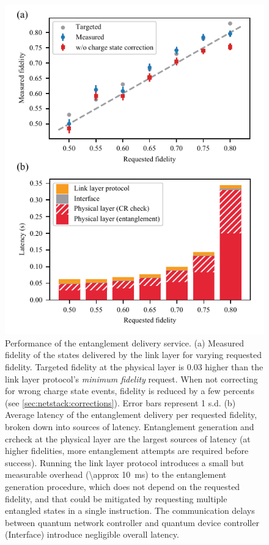 \begin{figure}
    \centering
    \includegraphics[width=0.6\linewidth]{figures/latencyvsfid.pdf}
    \caption{
        Performance of the entanglement delivery service.
        (a) Measured fidelity of the states delivered by the link layer for varying requested
        fidelity. Targeted fidelity at the physical layer is 0.03 higher than the link layer
        protocol's \emph{minimum fidelity} request. When not correcting for wrong charge state
        events, fidelity is reduced by a few percents (see \cref{sec:netstack:corrections}). Error
        bars represent \num{1} s.d.
        (b) Average latency of the entanglement delivery per requested fidelity, broken down into
        sources of latency. Entanglement generation and \acrlong{crcheck} at the physical layer are
        the largest sources of latency (at higher fidelities, more entanglement attempts are
        required before success). Running the link layer protocol introduces a small but measurable
        overhead (\qty{\approx 10}{ms}) to the entanglement generation procedure, which does not
        depend on the requested fidelity, and that could be mitigated by requesting multiple
        entangled states in a single instruction. The communication delays between quantum network
        controller and quantum device controller (Interface) introduce negligible overall latency.
    }
    \label{fig:latencyvsfid}
\end{figure}

